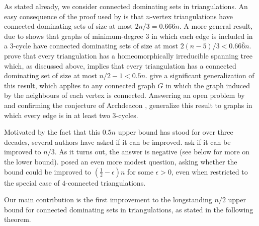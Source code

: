 \documentclass[11pt]{article}
\theoremstyle{definition}
\begin{document}
As stated already, we consider connected dominating sets in triangulations.  An easy consequence of the proof used by \citet{matheson.tarjan:dominating} is that $n$-vertex triangulations have connected dominating sets of size at most $2n/3=0.66\overline{6}n$.  A more general result, due to  \citet{kleitman.west:spanning} shows that graphs of minimum-degree $3$ in which each edge is included in a $3$-cycle have connected dominating sets of size at most $2(n-5)/3<0.66\overline{6}n$. \citet{albertson.berman.ea:graphs} prove that every triangulation has a homeomorphically irreducible spanning tree which, as discussed above, implies that every triangulation has a connected dominating set of size at most $n/2-1<0.5n$.
\citet{chen.ren.ea:homeomorphically} give a significant generalization of this result, which applies to any connected graph $G$ in which the graph induced by the neighbours of each vertex is connected.
Answering an open problem by \citet{albertson.berman.ea:graphs} and confirming the conjecture of Archdeacon \citep{Gross_Tucker_2009}, \citet{CHEN2013409} generalize this result to graphs in which every edge is in at least two $3$-cycles.


Motivated by the fact that this $0.5n$ upper bound has stood for over three decades, several authors have asked if it can be improved.  \citet[Question~4.2]{bradshaw.masarik.ea:robust} ask if it can be improved to $n/3$. As it turns out, the answer is negative (see below for more on the lower bound).  
 \citet{noguchi.zamfirescu:spanning} posed an even more modest question, asking whether the bound could be improved to $(\tfrac{1}{2}-\epsilon)n$ for some $\epsilon>0$, even when restricted to the special case of $4$-connected triangulations. %

Our main contribution is the first improvement to the longstanding $n/2$ upper bound for connected dominating sets in triangulations, as stated in the following theorem.
\end{document}
